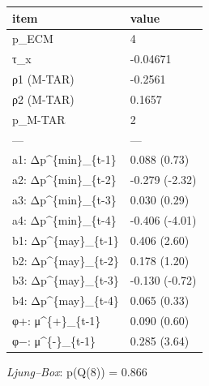 \documentclass[
  12pt,
]{article}
\begin{document}
\begin{longtable}[t]{ll}
\toprule
item & value\\
\midrule
p\_ECM & 4\\
τ\_x & -0.04671\\
ρ1 (M-TAR) & -0.2561\\
ρ2 (M-TAR) & 0.1657\\
p\_M-TAR & 2\\
\addlinespace
— & —\\
a1: Δp\textasciicircum{}\{min\}\_\{t-1\} & 0.088 (0.73)\\
a2: Δp\textasciicircum{}\{min\}\_\{t-2\} & -0.279 (-2.32)\\
a3: Δp\textasciicircum{}\{min\}\_\{t-3\} & 0.030 (0.29)\\
a4: Δp\textasciicircum{}\{min\}\_\{t-4\} & -0.406 (-4.01)\\
\addlinespace
b1: Δp\textasciicircum{}\{may\}\_\{t-1\} & 0.406 (2.60)\\
b2: Δp\textasciicircum{}\{may\}\_\{t-2\} & 0.178 (1.20)\\
b3: Δp\textasciicircum{}\{may\}\_\{t-3\} & -0.130 (-0.72)\\
b4: Δp\textasciicircum{}\{may\}\_\{t-4\} & 0.065 (0.33)\\
φ+: μ\textasciicircum{}\{+\}\_\{t-1\} & 0.090 (0.60)\\
\addlinespace
φ−: μ\textasciicircum{}\{-\}\_\{t-1\} & 0.285 (3.64)\\
\bottomrule
\end{longtable}

\emph{Ljung--Box}: p(Q(8)) = 0.866


\end{document}
